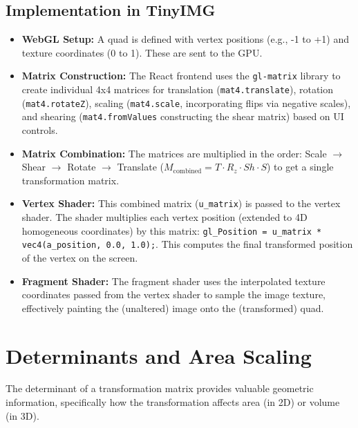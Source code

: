 \documentclass{article}
\begin{document}
\subsection{Implementation in TinyIMG}
\begin{itemize}
    \item \textbf{WebGL Setup:} A quad is defined with vertex positions (e.g., -1 to +1) and texture coordinates (0 to 1). These are sent to the GPU.
    \item \textbf{Matrix Construction:} The React frontend uses the \texttt{gl-matrix} library to create individual 4x4 matrices for translation (\texttt{mat4.translate}), rotation (\texttt{mat4.rotateZ}), scaling (\texttt{mat4.scale}, incorporating flips via negative scales), and shearing (\texttt{mat4.fromValues} constructing the shear matrix) based on UI controls.
    \item \textbf{Matrix Combination:} The matrices are multiplied in the order: Scale $\rightarrow$ Shear $\rightarrow$ Rotate $\rightarrow$ Translate ($M_{\text{combined}} = T \cdot R_z \cdot Sh \cdot S$) to get a single transformation matrix.
    \item \textbf{Vertex Shader:} This combined matrix (\texttt{u\_matrix}) is passed to the vertex shader. The shader multiplies each vertex position (extended to 4D homogeneous coordinates) by this matrix: \texttt{gl\_Position = u\_matrix * vec4(a\_position, 0.0, 1.0);}. This computes the final transformed position of the vertex on the screen.
    \item \textbf{Fragment Shader:} The fragment shader uses the interpolated texture coordinates passed from the vertex shader to sample the image texture, effectively painting the (unaltered) image onto the (transformed) quad.
\end{itemize}

\section{Determinants and Area Scaling}
\label{sec:determinants}
The determinant of a transformation matrix provides valuable geometric information, specifically how the transformation affects area (in 2D) or volume (in 3D).
\end{document}
